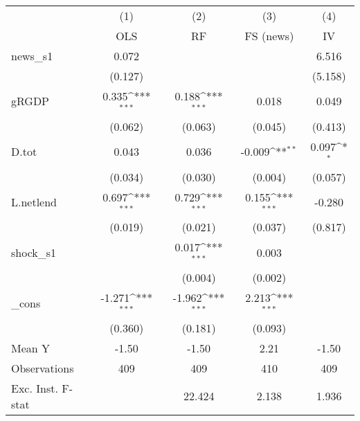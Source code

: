 {
\def\sym#1{\ifmmode^{#1}\else\(^{#1}\)\fi}
\begin{tabular}{l*{4}{c}}
\toprule
            &\multicolumn{1}{c}{(1)}&\multicolumn{1}{c}{(2)}&\multicolumn{1}{c}{(3)}&\multicolumn{1}{c}{(4)}\\
            &\multicolumn{1}{c}{OLS}&\multicolumn{1}{c}{RF}&\multicolumn{1}{c}{FS (news)}&\multicolumn{1}{c}{IV}\\
\midrule
news\_s1     &       0.072         &                     &                     &       6.516         \\
            &     (0.127)         &                     &                     &     (5.158)         \\
\addlinespace
gRGDP       &       0.335\sym{***}&       0.188\sym{***}&       0.018         &       0.049         \\
            &     (0.062)         &     (0.063)         &     (0.045)         &     (0.413)         \\
\addlinespace
D.tot       &       0.043         &       0.036         &      -0.009\sym{**} &       0.097\sym{*}  \\
            &     (0.034)         &     (0.030)         &     (0.004)         &     (0.057)         \\
\addlinespace
L.netlend   &       0.697\sym{***}&       0.729\sym{***}&       0.155\sym{***}&      -0.280         \\
            &     (0.019)         &     (0.021)         &     (0.037)         &     (0.817)         \\
\addlinespace
shock\_s1    &                     &       0.017\sym{***}&       0.003         &                     \\
            &                     &     (0.004)         &     (0.002)         &                     \\
\addlinespace
\_cons      &      -1.271\sym{***}&      -1.962\sym{***}&       2.213\sym{***}&                     \\
            &     (0.360)         &     (0.181)         &     (0.093)         &                     \\
\midrule
Mean Y      &       -1.50         &       -1.50         &        2.21         &       -1.50         \\
Observations&         409         &         409         &         410         &         409         \\
Exc. Inst. F-stat&                     &      22.424         &       2.138         &       1.936         \\
\bottomrule
\end{tabular}
}
